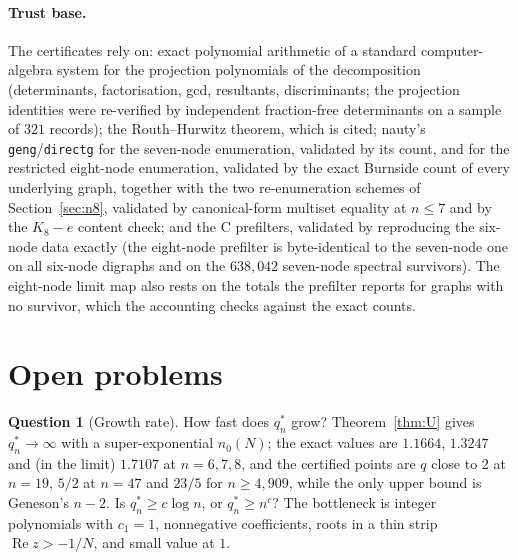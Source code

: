 \documentclass[11pt]{article}
\theoremstyle{definition}
\newtheorem{question}[theorem]{Question}
\newcommand{\Rea}{\operatorname{Re}}
\begin{document}
{\paragraph{Trust base.} The certificates rely on: exact polynomial arithmetic of a standard computer-algebra system for the projection polynomials of the
decomposition (determinants, factorisation, gcd, resultants, discriminants; the projection identities were re-verified by
independent fraction-free determinants on a sample of $321$ records); the Routh--Hurwitz theorem, which is cited; nauty's
\texttt{geng}/\texttt{directg} for the seven-node enumeration, validated by its count, and for the restricted eight-node
enumeration, validated by the exact Burnside count of every underlying graph, together with the two re-enumeration schemes of
Section~\ref{sec:n8}, validated by canonical-form multiset equality at $n\le7$ and by the $K_8-e$ content check; and the C
prefilters, validated by reproducing the six-node data exactly (the eight-node prefilter is byte-identical to the seven-node
one on all six-node digraphs and on the $638{,}042$ seven-node spectral survivors). The eight-node limit map also rests on the totals the prefilter reports for graphs with no
survivor, which the accounting checks against the exact counts.

\section{Open problems}\label{sec:open}

\begin{question}[Growth rate]\label{q:growth}
How fast does $q_n^*$ grow? Theorem~\ref{thm:U} gives $q_n^*\to\infty$ with a super-exponential $n_0(N)$; the exact values
are $1.1664$, $1.3247$ and (in the limit) $1.7107$ at $n=6,7,8$, and the certified points
are $q$ close to $2$ at $n=19$, $5/2$ at $n=47$ and $23/5$ for $n\ge4{,}909$, while the only upper bound is Geneson's $n-2$. Is
$q_n^*\ge c\log n$, or $q_n^*\ge n^c$? The bottleneck is integer polynomials with $c_1=1$, nonnegative coefficients, roots in a thin
strip $\Rea z>-1/N$, and small value at $1$.
\end{question}

}
\end{document}
